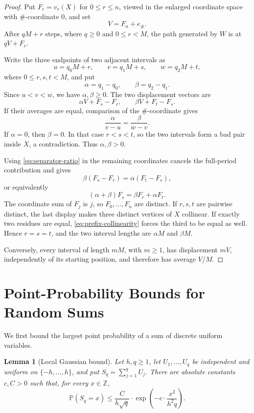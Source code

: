 \documentclass[11pt]{article}
\theoremstyle{plain}
\newtheorem{lemma}{Lemma}[section]
\theoremstyle{definition}
\theoremstyle{remark}
\newcommand{\Z}{\mathbb Z}
\newcommand{\Prob}{\mathbb P}
\begin{document}
\begin{proof}
Put \(F_r=v_r(X)\) for \(0\le r\le n\), viewed in the enlarged coordinate space with \(\#\)-coordinate \(0\), and set
\[
        V=F_n+e_\#.
\]
After \(qM+r\) steps, where \(q\ge0\) and \(0\le r<M\), the path generated by \(W\) is at \(qV+F_r\).

Write the three endpoints of two adjacent intervals as
\[
        u=q_0M+r,\qquad
        v=q_1M+s,\qquad
        w=q_2M+t,
\]
where \(0\le r,s,t<M\), and put
\[
        \alpha=q_1-q_0,\qquad \beta=q_2-q_1.
\]
Since \(u<v<w\), we have \(\alpha,\beta\ge0\). The two displacement vectors are
\[
        \alpha V+F_s-F_r,
        \qquad
        \beta V+F_t-F_s.
\]
If their averages are equal, comparison of the \(\#\)-coordinate gives
\begin{equation}\label{eq:separator-ratio}
        \frac{\alpha}{v-u}=\frac{\beta}{w-v}.
\end{equation}
If \(\alpha=0\), then \(\beta=0\). In that case \(r<s<t\), so the two intervals form a bad pair inside \(X\), a contradiction. Thus \(\alpha,\beta>0\).

Using \eqref{eq:separator-ratio} in the remaining coordinates cancels the full-period contribution and gives
\begin{equation}\label{eq:prefix-collinearity}
        \beta(F_s-F_r)=\alpha(F_t-F_s),
\end{equation}
or equivalently
\[
        (\alpha+\beta)F_s=\beta F_r+\alpha F_t.
\]
The coordinate sum of \(F_j\) is \(j\), so \(F_0,\ldots,F_n\) are distinct. If \(r,s,t\) are pairwise distinct, the last display makes three distinct vertices of \(X\) collinear. If exactly two residues are equal, \eqref{eq:prefix-collinearity} forces the third to be equal as well. Hence \(r=s=t\), and the two interval lengths are \(\alpha M\) and \(\beta M\).

Conversely, every interval of length \(mM\), with \(m\ge1\), has displacement \(mV\), independently of its starting position, and therefore has average \(V/M\).
\end{proof}

\section{Point-Probability Bounds for Random Sums}\label{sec:probability}

We first bound the largest point probability of a sum of discrete uniform variables.

\begin{lemma}[Local Gaussian bound]\label{lem:local-gaussian}
Let $h,q\ge1$, let $U_1,\ldots,U_q$ be independent and uniform on $\{-h,\ldots,h\}$, and put $S_q=\sum_{j=1}^qU_j$. There are absolute constants $c,C>0$ such that, for every $x\in\Z$,
\begin{equation}\label{eq:local-gaussian}
        \Prob(S_q=x)
        \le \frac{C}{h\sqrt q}\cdot
        \exp\left(-c\cdot\frac{x^2}{h^2q}\right).
\end{equation}
\end{lemma}
\end{document}
